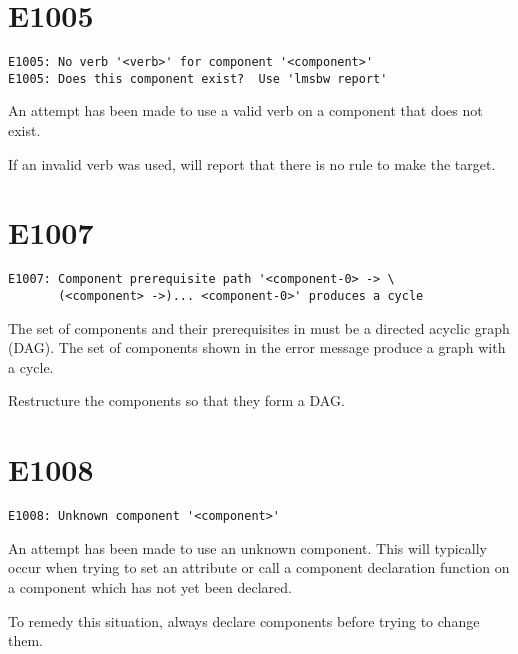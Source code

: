 \section{E1005}

\begin{footnotesize}
\begin{verbatim}
E1005: No verb '<verb>' for component '<component>'
E1005: Does this component exist?  Use 'lmsbw report'
\end{verbatim}
\end{footnotesize}

An attempt has been made to use a valid \lmsbw verb on a component
that does not exist.

If an invalid verb was used, \lmsbw will report that there is no rule
to make the target.

\section{E1007}

\begin{footnotesize}
\begin{verbatim}
E1007: Component prerequisite path '<component-0> -> \
       (<component> ->)... <component-0>' produces a cycle
\end{verbatim}
\end{footnotesize}

The set of components and their prerequisites in \lmsbw must be a
directed acyclic graph (DAG).  The set of components shown in the
error message produce a graph with a cycle.

Restructure the components so that they form a DAG.

\section{E1008}

\begin{footnotesize}
\begin{verbatim}
E1008: Unknown component '<component>'
\end{verbatim}
\end{footnotesize}

An attempt has been made to use an unknown component.  This will
typically occur when trying to set an attribute or call a component
declaration function on a component which has not yet been declared.

To remedy this situation, always declare components before trying to
change them.

